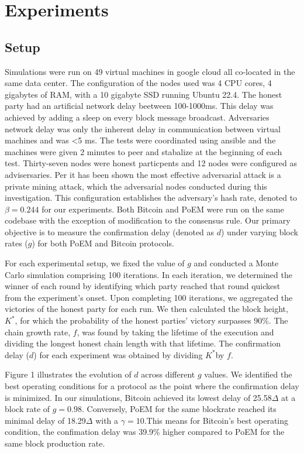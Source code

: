 \section{Experiments}\label{sec:experiments}

\subsection{Setup}

Simulations were run on 49 virtual machines in google cloud all co-located in
the same data center. The configuration of the nodes used was 4 CPU cores, 4
gigabytes of RAM, with a 10 gigabyte SSD running Ubuntu 22.4. The honest party
had an artificial network delay beetween 100-1000ms. This delay was achieved by
adding a sleep on every block message broadcast. Adversaries network delay was
only the inherent delay in communication between virtual machines and was <5 ms.
The tests were coordinated using ansible and the machines were given 2 minutes
to peer and stabalize at the beginning of each test. Thirty-seven nodes were
honest particpents and 12 nodes were configured as advisersaries.
Per\cite{eiar} it has been shown the most effective adversarial attack is a
private mining attack, which the adversarial nodes conducted during this
investigation. This configuration establishes the adversary's hash rate, denoted
to $\beta=0.244$ for our experiments. Both Bitcoin and PoEM were run on the same codebase
with the exception of modification to the consensus rule. Our primary objective is to
measure the confirmation delay (denoted as $d$) under varying block rates ($g$)
for both PoEM and Bitcoin protocols.

For each experimental setup, we fixed the value of $g$ and conducted a Monte
Carlo simulation comprising 100 iterations. In each iteration, we determined
the winner of each round by identifying which party reached that round quickest
from the experiment's onset. Upon completing 100 iterations, we aggregated the
victories of the honest party for each run. We then calculated the block
height, $K^*$, for which the probability of the honest parties' victory
surpasses 90\%. The chain growth rate, $f$, was found by taking the lifetime of
the execution and dividing the longest honest chain length with that lifetime.
The confirmation delay ($d$) for each experiment was obtained by dividing
$K^*$by $f$.

Figure 1 illustrates the evolution of $d$ across different $g$ values. We
identified the best operating conditions for a protocol as the point where the
confirmation delay is minimized. In our simulations, Bitcoin achieved its lowest
delay of 25.58$\Delta$ at a block rate of $g=0.98$. Conversely, PoEM for the
same blockrate reached its minimal delay of 18.29$\Delta$ with a
$\gamma=10$.This means for Bitcoin's best operating condition, the confimation
delay was 39.9\% higher compared to PoEM for the same block production rate.

